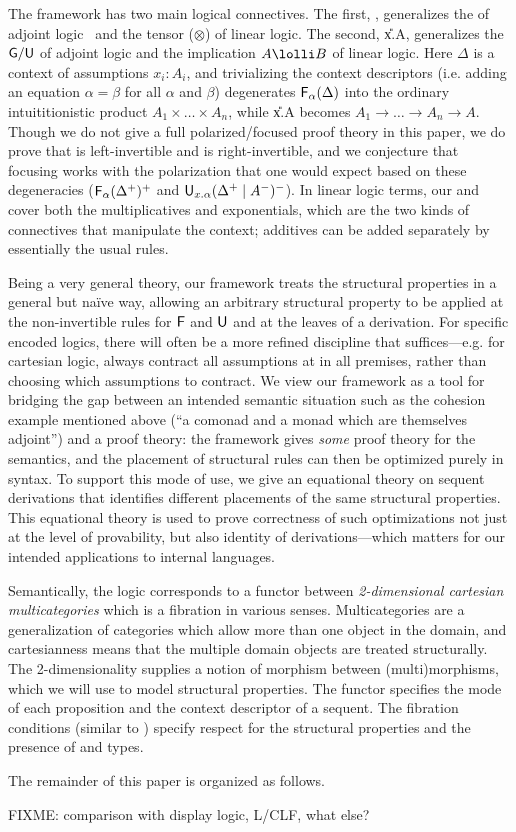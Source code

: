 The framework has two main logical connectives.  The first,
\F{\alpha}{\Delta}, generalizes the  of adjoint
logic~\citep{bentonwadler96adjoint,reed09adjoint} and the tensor
($\otimes$) of linear logic.  The second, \U{x.\alpha}{\Delta}{A},
generalizes the $\mathsf{G}/\mathsf{U}$ of adjoint logic and the implication
$A \lolli B$ of linear logic.  Here $\Delta$ is a context of assumptions
$x_i:A_i$, and trivializing the context descriptors (i.e. adding an
equation $\alpha = \beta$ for all $\alpha$ and $\beta$) degenerates
$\mathsf{F}_{\alpha}(\Delta)$ into the ordinary intuititionistic product $A_1
\times \ldots \times A_n$, while \U{x.\alpha}{\Delta}{A} becomes $A_1
\to \ldots \to A_n \to A$.  Though we do not give a full
polarized/focused proof theory in this paper, we do prove that 
is left-invertible and  is right-invertible, and we conjecture
that focusing works with the polarization that one would expect based on
these degeneracies ($\mathsf{F}_{\alpha}(\Delta^{\mathord{+}})^{\mathord{+}}$ and
$\mathsf{U}_{x.\alpha}(\Delta^{\mathord{+}} \mid A^{\mathord{-}})^{\mathord{-}}$).
In linear logic terms, our  and  cover both the
multiplicatives and exponentials, which are the two kinds of connectives
that manipulate the context; additives can be added separately by
essentially the usual rules.

Being a very general theory, our framework treats the structural
properties in a general but na\"ive way, allowing an arbitrary
structural property to be applied at the non-invertible rules for
$\mathsf{F}$ and $\mathsf{U}$ and at the leaves of a derivation.  For specific
encoded logics, there will often be a more refined discipline that
suffices---e.g. for cartesian logic, always contract all assumptions at
in all premises, rather than choosing which assumptions to contract.  We
view our framework as a tool for bridging the gap between an intended
semantic situation such as the cohesion example mentioned above (``a
comonad and a monad which are themselves adjoint'') and a proof theory:
the framework gives \emph{some} proof theory for the semantics, and the
placement of structural rules can then be optimized purely in syntax.
To support this mode of use, we give an equational theory on sequent
derivations that identifies different placements of the same structural
properties.  This equational theory is used to prove correctness of such
optimizations not just at the level of provability, but also identity of
derivations---which matters for our intended applications to internal
languages.

Semantically, the logic corresponds to a functor between
\emph{2-dimensional cartesian multicategories} which is a fibration in
various senses.  Multicategories are a generalization of categories
which allow more than one object in the domain, and cartesianness means
that the multiple domain objects are treated structurally.  The
2-dimensionality supplies a notion of morphism between (multi)morphisms,
which we will use to model structural properties.  The functor specifies
the mode of each proposition and the context descriptor of a sequent.
The fibration conditions (similar to \citep{hermida,hormann}) specify
respect for the structural properties and the presence of  and
 types.

The remainder of this paper is organized as follows.  

FIXME: comparison with display logic, L/CLF, what else?  

